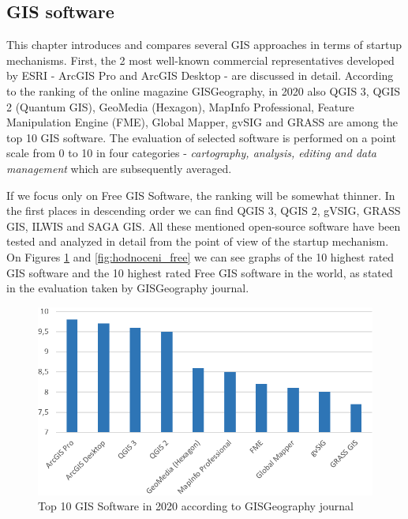 \documentclass[a4paper,10pt,twoside]{article}
\begin{document}
\subsection{GIS software}

This chapter introduces and compares several GIS approaches in terms of startup mechanisms. First, the 2 most well-known commercial representatives developed by ESRI - ArcGIS Pro and ArcGIS Desktop - are discussed in detail. According to the ranking of the online magazine GISGeography, in 2020 also QGIS 3, QGIS 2 (Quantum GIS), GeoMedia (Hexagon), MapInfo Professional, Feature Manipulation Engine (FME), Global Mapper, gvSIG and GRASS are among the top 10 GIS software. The evaluation of selected software is performed on a point scale from 0 to 10 in four categories - \textit{cartography, analysis, editing and data management} which are subsequently averaged. 

If we focus only on Free GIS Software, the ranking will be somewhat thinner. In the first places in descending order we can find QGIS 3, QGIS 2, gVSIG, GRASS GIS, ILWIS and SAGA GIS. All these mentioned open-source software have been tested and analyzed in detail from the point of view of the startup mechanism. On Figures \ref{fig:hodnoceni_all} and  \ref{fig:hodnoceni_free} we can see graphs of the 10 highest rated GIS software and the 10 highest rated Free GIS software in the world, as stated in the evaluation taken by GISGeography journal.

\vspace{0.3cm}
\begin{figure}[hbt!] 
\begin{center}
\includegraphics[width=13cm]{pictures/hodnoceni_all.png} 
\caption[Top 10 GIS Software in 2020 according to GISGeography journal]{Top 10 GIS Software in 2020 according to GISGeography journal}
\label{fig:hodnoceni_all}
\end{center}
\end{figure}
\end{document}
